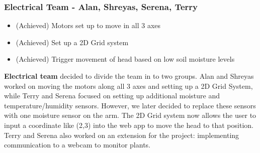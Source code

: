 \documentclass{article}
\begin{document}
\subsubsection{\textbf{Electrical Team - Alan, Shreyas, Serena, Terry}}
\vspace{3mm}

\begin{itemize}
    \vspace{-3mm}
    \setlength{\itemsep}{0pt}%
    \setlength{\parskip}{0pt}
    \item (Achieved) Motors set up to move in all 3 axes
    \item (Achieved) Set up a 2D Grid system
    \item (Achieved) Trigger movement of head based on low soil moisture levels
\end{itemize}

\textbf{Electrical team} decided to divide the team in to two groups. Alan and Shreyas worked on moving the motors along all 3 axes and setting up a 2D Grid System, while Terry and Serena focused on setting up additional moisture and temperature/humidity sensors. However, we later decided to replace these sensors with one moisture sensor on the arm. The 2D Grid system now allows the user to input a coordinate like (2,3) into the web app to move the head to that position. Terry and Serena also worked on an extension for the project: implementing communication to a webcam to monitor plants.
\end{document}
